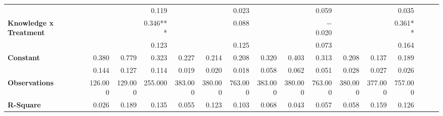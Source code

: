 \begin{tabular}{@{\extracolsep{5pt}}lrrrrrrrrrrrrrrr}
{\bf } & \phantom{***} & \phantom{***} & 0.119\phantom{\phantom{)}***} & \phantom{***} & \phantom{***} & 0.023\phantom{\phantom{)}***} & \phantom{***} & \phantom{***} & 0.059\phantom{\phantom{)}***} & \phantom{***} & \phantom{***} & 0.035\phantom{\phantom{)}***} \\
{\bf Knowledge x Treatment} & \phantom{***} & \phantom{***} & 0.346\phantom{)}*** & \phantom{***} & \phantom{***} & 0.088\phantom{\phantom{)}***} & \phantom{***} & \phantom{***} & $-$0.020\phantom{\phantom{)}***} & \phantom{***} & \phantom{***} & 0.361\phantom{)}**\phantom{*} \\
{\bf } & \phantom{***} & \phantom{***} & 0.123\phantom{\phantom{)}***} & \phantom{***} & \phantom{***} & 0.125\phantom{\phantom{)}***} & \phantom{***} & \phantom{***} & 0.073\phantom{\phantom{)}***} & \phantom{***} & \phantom{***} & 0.164\phantom{\phantom{)}***} \\
{\bf Constant} & 0.380\phantom{\phantom{)}***} & 0.779\phantom{\phantom{)}***} & 0.323\phantom{\phantom{)}***} & 0.227\phantom{\phantom{)}***} & 0.214\phantom{\phantom{)}***} & 0.208\phantom{\phantom{)}***} & 0.320\phantom{\phantom{)}***} & 0.403\phantom{\phantom{)}***} & 0.313\phantom{\phantom{)}***} & 0.208\phantom{\phantom{)}***} & 0.137\phantom{\phantom{)}***} & 0.189\phantom{\phantom{)}***} \\
{\bf } & 0.144\phantom{\phantom{)}***} & 0.127\phantom{\phantom{)}***} & 0.114\phantom{\phantom{)}***} & 0.019\phantom{\phantom{)}***} & 0.020\phantom{\phantom{)}***} & 0.018\phantom{\phantom{)}***} & 0.058\phantom{\phantom{)}***} & 0.062\phantom{\phantom{)}***} & 0.051\phantom{\phantom{)}***} & 0.028\phantom{\phantom{)}***} & 0.027\phantom{\phantom{)}***} & 0.026\phantom{\phantom{)}***} \\
{\bf Observations} & 126.000\phantom{\phantom{)}***} & 129.000\phantom{\phantom{)}***} & 255.000\phantom{\phantom{)}***} & 383.000\phantom{\phantom{)}***} & 380.000\phantom{\phantom{)}***} & 763.000\phantom{\phantom{)}***} & 383.000\phantom{\phantom{)}***} & 380.000\phantom{\phantom{)}***} & 763.000\phantom{\phantom{)}***} & 380.000\phantom{\phantom{)}***} & 377.000\phantom{\phantom{)}***} & 757.000\phantom{\phantom{)}***} \\
{\bf R-Square} & 0.026\phantom{***} & 0.189\phantom{***} & 0.135\phantom{***} & 0.055\phantom{***} & 0.123\phantom{***} & 0.103\phantom{***} & 0.068\phantom{***} & 0.043\phantom{***} & 0.057\phantom{***} & 0.058\phantom{***} & 0.159\phantom{***} & 0.126\phantom{***} \\
\hline
\end{tabular}
